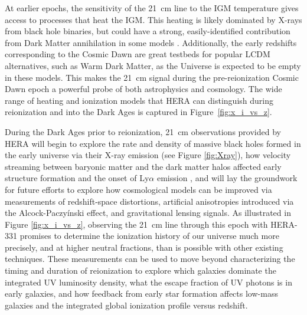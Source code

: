\documentclass[preprint]{aastex}
\begin{document}
At earlier epochs, the sensitivity of the 21~cm line to the IGM temperature gives access to 
processes that heat the IGM.  This heating is likely dominated by X-rays from black
hole binaries, but could have a strong, easily-identified contribution from
Dark Matter annihilation in some models \citep{mesinger_et_al2013}.  Additionally, the early redshifts
corresponding to the Cosmic Dawn are great testbeds for popular LCDM
alternatives, such as Warm Dark Matter, as the Universe is expected to be empty
in these models.  This makes the 21~cm signal during the pre-reionization Cosmic
Dawn epoch a powerful probe of both astrophysics and cosmology.
The wide range of heating and ionization models that HERA
can distinguish during reionization and into the Dark Ages is captured in
Figure~\ref{fig:x_i_vs_z}.  

During the Dark Ages prior to reionization, 21~cm observations provided by HERA
will begin to explore the rate and density of massive black holes formed in the
early universe \citep{pritchard_loeb2010} via their X-ray emission (see Figure \ref{fig:Xray}), 
how velocity streaming between baryonic 
matter and the dark matter halos affected early structure formation and the onset
of Ly$\alpha$ emission \citep{visbal_et_al2012}, and will lay the groundwork for future
efforts to explore how 
cosmological models can be improved via measurements of redshift-space distortions,
artificial anisotropies introduced via the Alcock-Paczy\'inski effect, and
gravitational lensing signals\citep{furlanetto_et_al2006}.
As illustrated in Figure \ref{fig:x_i_vs_z}, observing the 21~cm line 
through this epoch with HERA-331 
promises to determine the ionization history of our universe much more precisely,
and at higher neutral fractions, than is possible with other existing techniques.  These measurements can
be used to move beyond characterizing the timing and duration of reionization to
explore which galaxies dominate the integrated UV luminosity density, what the escape fraction
of UV photons is in early galaxies, and how feedback from early star formation affects low-mass galaxies and the integrated 
global ionization profile versus
redshift. 
\end{document}
